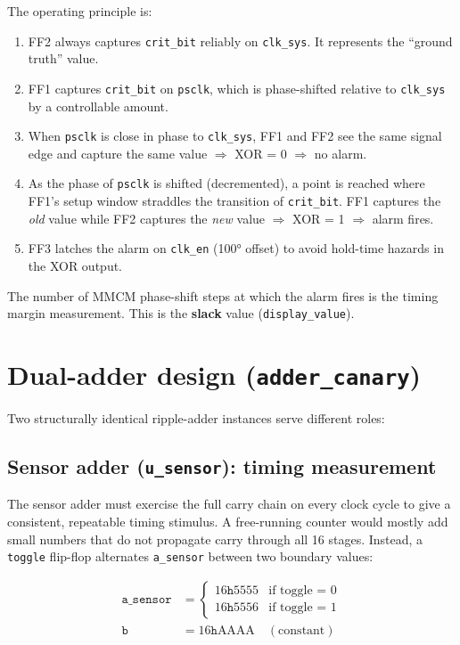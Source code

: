 \documentclass[12pt, a4paper]{report}
\begin{document}
The operating principle is:

\begin{enumerate}
  \item FF2 always captures \texttt{crit\_bit} reliably on \texttt{clk\_sys}. It represents
        the ``ground truth'' value.
  \item FF1 captures \texttt{crit\_bit} on \texttt{psclk}, which is phase-shifted relative to
        \texttt{clk\_sys} by a controllable amount.
  \item When \texttt{psclk} is close in phase to \texttt{clk\_sys}, FF1 and FF2 see the same
        signal edge and capture the same value $\Rightarrow$ XOR = 0 $\Rightarrow$ no alarm.
  \item As the phase of \texttt{psclk} is shifted (decremented), a point is reached where
        FF1's setup window straddles the transition of \texttt{crit\_bit}. FF1 captures the
        \emph{old} value while FF2 captures the \emph{new} value $\Rightarrow$ XOR = 1
        $\Rightarrow$ alarm fires.
  \item FF3 latches the alarm on \texttt{clk\_en} (100° offset) to avoid hold-time hazards
        in the XOR output.
\end{enumerate}

The number of MMCM phase-shift steps at which the alarm fires is the timing margin measurement.
This is the \textbf{slack} value (\texttt{display\_value}).

\section{Dual-adder design (\texttt{adder\_canary})}

Two structurally identical ripple-adder instances serve different roles:

\subsection{Sensor adder (\texttt{u\_sensor}): timing measurement}

The sensor adder must exercise the full carry chain on every clock cycle to give a
consistent, repeatable timing stimulus. A free-running counter would mostly add small
numbers that do not propagate carry through all 16 stages. Instead, a \texttt{toggle}
flip-flop alternates \texttt{a\_sensor} between two boundary values:

\begin{align}
  \texttt{a\_sensor} &= \begin{cases} 16\texttt{h}5555 & \text{if toggle = 0} \\ 16\texttt{h}5556 & \text{if toggle = 1} \end{cases} \\
  \texttt{b} &= 16\texttt{h}\text{AAAA} \quad(\text{constant})
\end{align}
\end{document}
